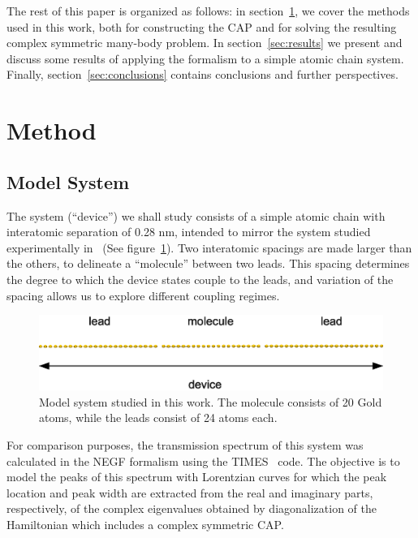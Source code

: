 The rest of this paper is organized as follows: in section~\ref{sec:method}, we
cover the methods used in this work, both for constructing the \ac{CAP} and for
solving the resulting complex symmetric many-body problem. In
section~\ref{sec:results} we present and discuss some results of applying the
formalism to a simple atomic chain system. Finally,
section~\ref{sec:conclusions} contains conclusions and further perspectives.


\section{Method}
\label{sec:method}

\subsection{Model System}
\label{subsec:modelsystem}

The system (``device'') we shall study consists of a simple atomic chain with
interatomic separation of 0.28 nm, intended to mirror the system studied
experimentally in~\cite{nilius2002science} (See
figure~\ref{fig:chaincapdevice}). Two interatomic spacings are made larger than
the others, to delineate a ``molecule'' between two leads. This spacing
determines the degree to which the device states couple to the leads, and
variation of the spacing allows us to explore different coupling regimes.

\begin{figure}
	\begin{center}
		\includegraphics[width=0.9\linewidth]{figures/chaincapdevice}
	\end{center}
	\caption{Model system studied in this work. The molecule consists of 20
	Gold atoms, while the leads consist of 24 atoms each.}
	\label{fig:chaincapdevice}
\end{figure}

For comparison purposes, the transmission spectrum of this system was
calculated in the \ac{NEGF} formalism using the TIMES~\cite{times} code. The
objective is to model the peaks of this spectrum with Lorentzian curves for
which the peak location and peak width are extracted from the real and
imaginary parts, respectively, of the complex eigenvalues obtained by
diagonalization of the Hamiltonian which includes a complex symmetric \ac{CAP}.

